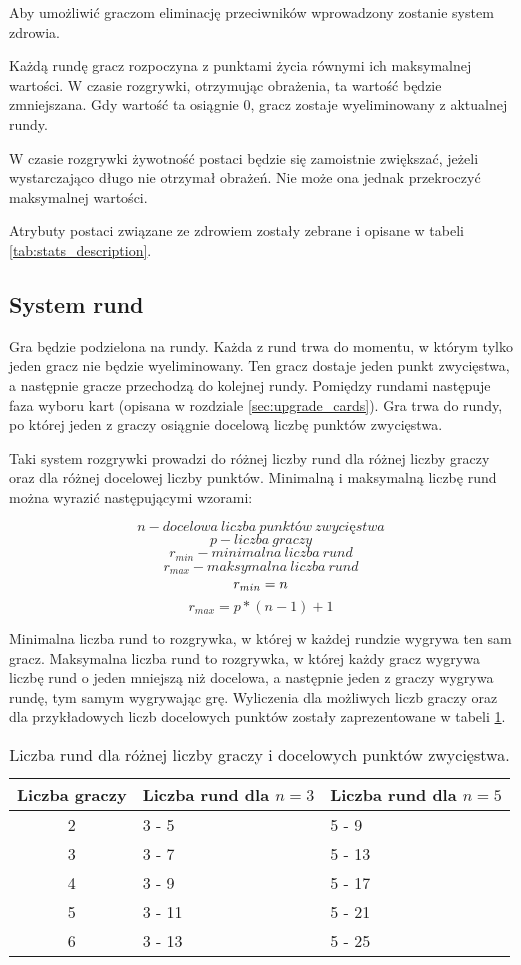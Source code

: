 Aby umożliwić graczom eliminację przeciwników wprowadzony zostanie system zdrowia. 

Każdą rundę gracz rozpoczyna z punktami życia równymi ich maksymalnej wartości. W czasie rozgrywki, otrzymując obrażenia, ta wartość będzie zmniejszana. Gdy wartość ta osiągnie 0, gracz zostaje wyeliminowany z aktualnej rundy.

W czasie rozgrywki żywotność postaci będzie się zamoistnie zwiększać, jeżeli wystarczająco długo nie otrzymał obrażeń. Nie może ona jednak przekroczyć maksymalnej wartości.

Atrybuty postaci związane ze zdrowiem zostały zebrane i opisane w tabeli \ref{tab:stats_description}.

\subsection{System rund}

Gra będzie podzielona na rundy. Każda z rund trwa do momentu, w którym tylko jeden gracz nie będzie wyeliminowany. Ten gracz dostaje jeden punkt zwycięstwa, a następnie gracze przechodzą do kolejnej rundy. Pomiędzy rundami następuje faza wyboru kart (opisana w rozdziale \ref{sec:upgrade_cards}). Gra trwa do rundy, po której jeden z graczy osiągnie docelową liczbę punktów zwycięstwa.

Taki system rozgrywki prowadzi do różnej liczby rund dla różnej liczby graczy oraz dla różnej docelowej liczby punktów. Minimalną i maksymalną liczbę rund można wyrazić następującymi wzorami:

$$ n - docelowa\ liczba\ punktów\ zwycięstwa $$
$$ p - liczba\ graczy $$
$$ r_{min} - minimalna\ liczba\ rund $$
$$ r_{max} - maksymalna\ liczba\ rund $$
$$ r_{min} = n \\ $$
$$ r_{max} = p * (n-1) + 1 $$

Minimalna liczba rund to rozgrywka, w której w każdej rundzie wygrywa ten sam gracz. Maksymalna liczba rund to rozgrywka, w której każdy gracz wygrywa liczbę rund o jeden mniejszą niż docelowa, a następnie jeden z graczy wygrywa rundę, tym samym wygrywając grę. Wyliczenia dla możliwych liczb graczy oraz dla przykładowych liczb docelowych punktów zostały zaprezentowane w tabeli \ref{tab:round_count}.

\begin{table}
    \centering
    \caption{Liczba rund dla różnej liczby graczy i docelowych punktów zwycięstwa.}
    \label{tab:round_count}
    \begin{tabularx}{\linewidth}{|c||X|X|}
        \hline
        Liczba graczy & Liczba rund dla $n=3$ & Liczba rund dla $n=5$ \\
        \hline \hline
        2 & 3 - 5 & 5 - 9 \\
        \hline 
        3 & 3 - 7 & 5 - 13 \\
        \hline
        4 & 3 - 9 & 5 - 17 \\
        \hline
        5 & 3 - 11 & 5 - 21 \\
        \hline
        6 & 3 - 13 & 5 - 25 \\
        \hline 
    \end{tabularx}
\end{table}

